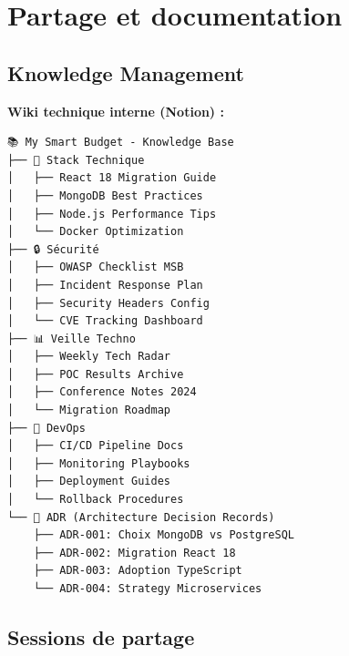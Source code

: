 \section{Partage et documentation}

\subsection{Knowledge Management}

\begin{exemple}
\textbf{Wiki technique interne (Notion) :}
\begin{verbatim}
📚 My Smart Budget - Knowledge Base
├── 🔧 Stack Technique
│   ├── React 18 Migration Guide
│   ├── MongoDB Best Practices
│   ├── Node.js Performance Tips
│   └── Docker Optimization
├── 🔒 Sécurité
│   ├── OWASP Checklist MSB
│   ├── Incident Response Plan
│   ├── Security Headers Config
│   └── CVE Tracking Dashboard
├── 📊 Veille Techno
│   ├── Weekly Tech Radar
│   ├── POC Results Archive
│   ├── Conference Notes 2024
│   └── Migration Roadmap
├── 🚀 DevOps
│   ├── CI/CD Pipeline Docs
│   ├── Monitoring Playbooks
│   ├── Deployment Guides
│   └── Rollback Procedures
└── 📝 ADR (Architecture Decision Records)
    ├── ADR-001: Choix MongoDB vs PostgreSQL
    ├── ADR-002: Migration React 18
    ├── ADR-003: Adoption TypeScript
    └── ADR-004: Strategy Microservices
\end{verbatim}
\end{exemple}

\subsection{Sessions de partage}

